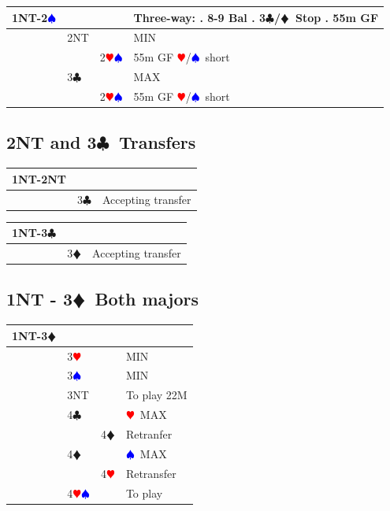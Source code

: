 \documentclass[a4paper]{article}
\newcommand{\BC}{\textcolor{OliveGreen}{$\clubsuit$}}
\newcommand{\BD}{\textcolor{RedOrange}{$\vardiamondsuit$}}
\newcommand{\BH}{\textcolor{Red}{$\varheartsuit${}}}
\newcommand{\BS}{\textcolor{Blue}{$\spadesuit${}}}
\newcommand{\pdfc}{\texorpdfstring{\BC{}}{C}}
\newcommand{\pdfd}{\texorpdfstring{\BD{}}{D}}
\begin{document}
\begingroup
\renewcommand{\arraystretch}{1.4}
\begin{xltabular}{\linewidth}{|l|l|l|X|}
\hline
1NT-2\BS &  &  & Three-way: . 8-9 Bal . 3\BC /\BD\ Stop . 55m GF \\
\hline
 & 2NT &  & MIN \\
\hline
 &  & 2\BH\BS & 55m GF \BH /\BS\ short \\
\hline
 & 3\BC &  & MAX \\
\hline
 &  & 2\BH\BS & 55m GF \BH /\BS\ short \\
\hline
\end{xltabular}
\endgroup
\bigbreak
\subsection{2NT and 3\pdfc\ Transfers}

\begingroup
\renewcommand{\arraystretch}{1.4}
\begin{xltabular}{\linewidth}{|l|l|X|}
\hline
1NT-2NT &  &  \\
\hline
 & 3\BC & Accepting transfer \\
\hline
\end{xltabular}
\endgroup
\bigbreak
\begingroup
\renewcommand{\arraystretch}{1.4}
\begin{xltabular}{\linewidth}{|l|l|X|}
\hline
1NT-3\BC &  &  \\
\hline
 & 3\BD & Accepting transfer \\
\hline
\end{xltabular}
\endgroup
\bigbreak
\subsection{1NT - 3\pdfd\ Both majors}

\begingroup
\renewcommand{\arraystretch}{1.4}
\begin{xltabular}{\linewidth}{|l|l|l|X|}
\hline
1NT-3\BD &  &  &  \\
\hline
 & 3\BH &  & MIN \\
\hline
 & 3\BS &  & MIN \\
\hline
 & 3NT &  & To play 22M \\
\hline
 & 4\BC &  & \BH\ MAX \\
\hline
 &  & 4\BD & Retranfer \\
\hline
 & 4\BD &  & \BS\ MAX \\
\hline
 &  & 4\BH & Retransfer \\
\hline
 & 4\BH\BS &  & To play \\
\hline
\end{xltabular}
\endgroup
\bigbreak
\end{document}
